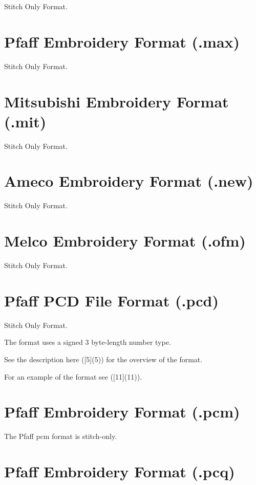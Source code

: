 Stitch Only Format.

\section{Pfaff Embroidery Format (.max)}

Stitch Only Format.

\section{Mitsubishi Embroidery Format (.mit)}

Stitch Only Format.

\section{Ameco Embroidery Format (.new)}

Stitch Only Format.

\section{Melco Embroidery Format (.ofm)}

Stitch Only Format.

\section{Pfaff PCD File Format (.pcd)}

Stitch Only Format.

The format uses a signed 3 byte-length number type.

See the description here ([5](5)) for the overview of the format.

For an example of the format see ([11](11)).

\section{Pfaff Embroidery Format (.pcm)}

The Pfaff pcm format is stitch-only.

\section{Pfaff Embroidery Format (.pcq)}


